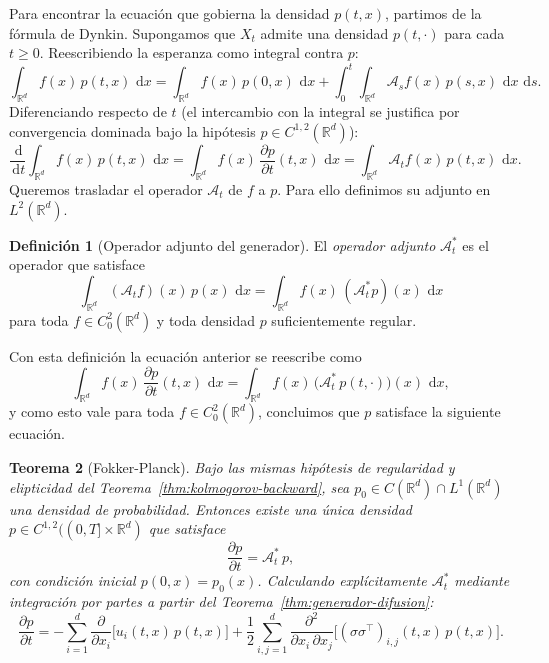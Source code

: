\documentclass[12pt, a4paper]{report}
\theoremstyle{plain}
\newtheorem{theorem}{Teorema}[chapter]
\theoremstyle{definition}
\newtheorem{definition}[theorem]{Definición}
\theoremstyle{remark}
\newcommand{\R}{\mathbb{R}}
\newcommand{\dd}{\,\mathrm{d}}
\begin{document}
Para encontrar la ecuación que gobierna la densidad $p(t,x)$, partimos de la fórmula de Dynkin. Supongamos que $X_t$ admite una densidad $p(t,\cdot)$ para cada $t \geq 0$. Reescribiendo la esperanza como integral contra $p$:
\[
  \int_{\R^d} f(x)\,p(t,x)\,\dd x
  = \int_{\R^d} f(x)\,p(0,x)\,\dd x
  + \int_0^t \int_{\R^d} \mathcal{A}_s f(x)\,p(s,x)\,\dd x\,\dd s.
\]
Diferenciando respecto de $t$ (el intercambio con la integral se justifica por convergencia dominada bajo la hipótesis $p \in C^{1,2}(\R^d)$):
\[
  \frac{\dd}{\dd t}\int_{\R^d} f(x)\,p(t,x)\,\dd x
  = \int_{\R^d} f(x)\,\frac{\partial p}{\partial t}(t,x)\,\dd x
  = \int_{\R^d} \mathcal{A}_t f(x)\,p(t,x)\,\dd x.
\]
Queremos trasladar el operador $\mathcal{A}_t$ de $f$ a $p$. Para ello definimos su adjunto en $L^2(\R^d)$.

\begin{definition}[Operador adjunto del generador]
\label{def:adjunto}
El \emph{operador adjunto} $\mathcal{A}_t^*$ es el operador que satisface
\[
  \int_{\R^d} (\mathcal{A}_t f)(x)\,p(x)\,\dd x
  = \int_{\R^d} f(x)\,(\mathcal{A}_t^* p)(x)\,\dd x
\]
para toda $f \in C_0^2(\R^d)$ y toda densidad $p$ suficientemente regular.
\end{definition}

Con esta definición la ecuación anterior se reescribe como
\[
  \int_{\R^d} f(x)\,\frac{\partial p}{\partial t}(t,x)\,\dd x
  = \int_{\R^d} f(x)\,\bigl(\mathcal{A}_t^*\, p(t,\cdot)\bigr)(x)\,\dd x,
\]
y como esto vale para toda $f \in C_0^2(\R^d)$, concluimos que $p$ satisface la siguiente ecuación.

\begin{theorem}[Fokker-Planck]
\label{thm:fokker-planck}
Bajo las mismas hipótesis de regularidad y elipticidad del Teorema~\ref{thm:kolmogorov-backward}, sea $p_0 \in C(\R^d) \cap L^1(\R^d)$ una densidad de probabilidad. Entonces existe una única densidad $p \in C^{1,2}((0,T]\times\R^d)$ que satisface
\[
  \frac{\partial p}{\partial t} = \mathcal{A}_t^*\, p,
\]
con condición inicial $p(0,x) = p_0(x)$. Calculando explícitamente $\mathcal{A}_t^*$ mediante integración por partes a partir del Teorema~\ref{thm:generador-difusion}:
\begin{equation}
  \label{eq:fokker-planck}
  \frac{\partial p}{\partial t}
  = -\sum_{i=1}^{d} \frac{\partial}{\partial x_i}\bigl[u_i(t,x)\,p(t,x)\bigr]
  + \frac{1}{2}\sum_{i,j=1}^{d}
    \frac{\partial^2}{\partial x_i\,\partial x_j}
    \bigl[(\sigma\sigma^{\top})_{i,j}(t,x)\,p(t,x)\bigr].
\end{equation}
\end{theorem}
\end{document}
